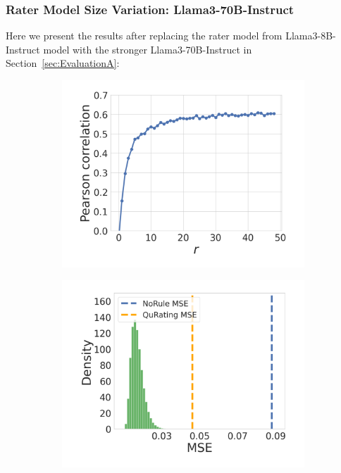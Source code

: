 \documentclass{article}
\begin{document}
\vspace{-1mm}
\subsubsection{Rater Model Size Variation: Llama3-70B-Instruct}\label{subsubsec:Appendix-EvalA-Llama3-70B}
Here we present the results after replacing the rater model from Llama3-8B-Instruct model with the stronger Llama3-70B-Instruct in Section~\ref{sec:EvaluationA}:

\begin{figure}[h]
\centering
\begin{subfigure}[b]{0.3\linewidth} 
    \centering
    \includegraphics[width=\linewidth]{figures/EvalA_IMDB_Single70B_pearson.pdf}
    \caption{}
    \label{fig:EvalA_IMDB_Single70B_pearson}
\end{subfigure}
\begin{subfigure}[b]{0.3\linewidth}
    \centering
    \includegraphics[width=\linewidth]{figures/EvalA_IMDB_Single70B_histogram.pdf}

\end{subfigure}
\end{figure}
\end{document}

